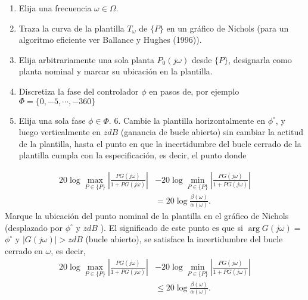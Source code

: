 \begin{enumerate}
  \item Elija una frecuencia $\omega \in \Omega$.

  \item Traza la curva de la plantilla $T_{\omega}$ de $\{P\}$ en un gráfico de Nichols (para un algoritmo eficiente ver Ballance y Hughes (1996)).

  \item Elija arbitrariamente una sola planta $P_{0}(j \omega)$ desde $\{P\}$, designarla como planta nominal y marcar su ubicación en la plantilla.

  \item Discretiza la fase del controlador $\phi$ en pasos de, por ejemplo $\Phi=\{0,-5, \cdots,-360\}$

  \item Elija una sola fase $\phi \in \Phi$. 6. Cambie la plantilla horizontalmente en $\phi^{\circ}$, y luego verticalmente en $z d B$ (ganancia de bucle abierto) sin cambiar la actitud de la plantilla, hasta el punto en que la incertidumbre del bucle cerrado de la plantilla cumpla con la especificación, es decir, el punto donde

\end{enumerate}
$$
\begin{aligned}
20 \log \max _{P \in\{P\}}\left|\frac{P G(j \omega)}{1+P G(j \omega)}\right| &-20 \log \min _{P \in\{P\}}\left|\frac{P G(j \omega)}{1+P G(j \omega)}\right| \\
&=20 \log \frac{\beta(\omega)}{\alpha(\omega)} .
\end{aligned}
$$
Marque la ubicación del punto nominal de la plantilla en el gráfico de Nichols (desplazado por $\phi^{\circ}$ y $z d B$ ). El significado de este punto es que si $\arg G(j \omega)=$ $\phi^{\circ}$ y $| G(j \omega)|>z d B$ (bucle abierto), se satisface la incertidumbre del bucle cerrado en $\omega$, es decir,
$$
\begin{aligned}
20 \log \max _{P \in\{P\}}\left|\frac{P G(j \omega)}{1+P G(j \omega)}\right| &-20 \log \min _{P \in\{P\}}\left|\frac{P G(j \omega)}{1+P G(j \omega)}\right| \\
& \leq 20 \log \frac{\beta(\omega)}{\alpha(\omega)} .
\end{aligned}
$$

